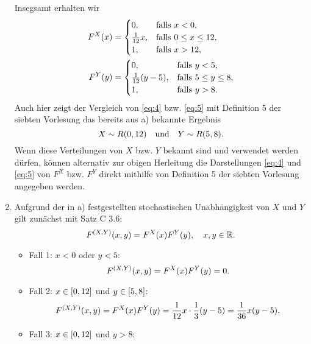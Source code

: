 \documentclass{exercise}
\begin{document}
\begin{enumerate}
        Insegsamt erhalten wir
        \begin{align}
            F^X\parentheses*{x} &= \begin{cases}
                0, & \text{falls }x < 0,\\
                \frac{1}{12}x, & \text{falls }0 \le x \le 12,\\
                1, & \text{falls }x > 12,
            \end{cases}\label{eq:4}\\
            F^Y\parentheses*{y} &= \begin{cases}
                0, & \text{falls }y < 5,\\
                \frac{1}{12}\parentheses*{y - 5}, & \text{falls }5 \le y \le 8,\\
                1, & \text{falls }y > 8.
            \end{cases}\label{eq:5}
        \end{align}
        Auch hier zeigt der Vergleich von \eqref{eq:4} bzw. \eqref{eq:5} mit Definition 5 der siebten Vorlesung das bereits aus a) bekannte Ergebnis
        \[
            X \sim R\parentheses*{0, 12} \quad \text{und} \quad Y \sim R\parentheses*{5, 8}.
        \]
        Wenn diese Verteilungen von \(X\) bzw. \(Y\) bekannt sind und verwendet werden dürfen, können alternativ zur obigen Herleitung die Darstellungen \eqref{eq:4} und \eqref{eq:5} von \(F^X\) bzw. \(F^Y\) direkt mithilfe von Definition 5 der siebten Vorlesung angegeben werden.
        \item Aufgrund der in a) festgestellten stochastischen Unabhängigkeit von \(X\) und \(Y\) gilt zunächst mit Satz C 3.6:
        \[
            F^{\parentheses*{X, Y}}\parentheses*{x, y} = F^X\parentheses*{x}F^Y\parentheses*{y}, \quad x, y \in \R.
        \]
        \begin{itemize}
            \item Fall 1: \(x < 0\) oder \(y < 5\):
            \[
                F^{\parentheses*{X, Y}}\parentheses*{x, y} = F^X\parentheses*{x}F^Y\parentheses*{y} = 0.
            \]
            \item Fall 2: \(x \in \brackets*{0, 12}\) und \(y \in \brackets*{5, 8}\):
            \[
                F^{\parentheses*{X, Y}}\parentheses*{x, y} = F^X\parentheses*{x}F^Y\parentheses*{y} = \frac{1}{12}x \cdot \frac{1}{3}\parentheses*{y - 5} = \frac{1}{36}x\parentheses*{y - 5}.
            \]
            \item Fall 3: \(x \in \brackets*{0, 12}\) und \(y > 8\):
            \[
\]
\end{itemize}
\end{enumerate}
\end{document}
